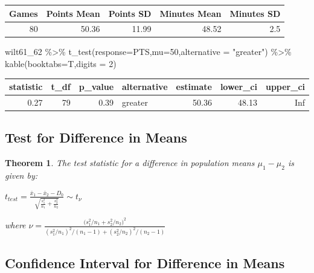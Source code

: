 \documentclass[
  11pt,
]{book}
\newenvironment{Shaded}{\begin{snugshade}}{\end{snugshade}}
\newcommand{\AttributeTok}[1]{\textcolor[rgb]{0.77,0.63,0.00}{#1}}
\newcommand{\DecValTok}[1]{\textcolor[rgb]{0.00,0.00,0.81}{#1}}
\newcommand{\FunctionTok}[1]{\textcolor[rgb]{0.00,0.00,0.00}{#1}}
\newcommand{\NormalTok}[1]{#1}
\newcommand{\SpecialCharTok}[1]{\textcolor[rgb]{0.00,0.00,0.00}{#1}}
\newcommand{\StringTok}[1]{\textcolor[rgb]{0.31,0.60,0.02}{#1}}
\newtheorem{theorem}{Theorem}[chapter]
\theoremstyle{definition}
\theoremstyle{definition}
\theoremstyle{definition}
\theoremstyle{definition}
\theoremstyle{remark}
\begin{document}
\begin{tabular}{rrrrr}
\toprule
Games & Points Mean & Points SD & Minutes Mean & Minutes SD\\
\midrule
80 & 50.36 & 11.99 & 48.52 & 2.5\\
\bottomrule
\end{tabular}

\bigskip

\begin{Shaded}
\begin{Highlighting}[]
\NormalTok{wilt61\_62 }\SpecialCharTok{\%\textgreater{}\%} \FunctionTok{t\_test}\NormalTok{(}\AttributeTok{response=}\NormalTok{PTS,}\AttributeTok{mu=}\DecValTok{50}\NormalTok{,}\AttributeTok{alternative =} \StringTok{"greater"}\NormalTok{) }\SpecialCharTok{\%\textgreater{}\%} 
  \FunctionTok{kable}\NormalTok{(}\AttributeTok{booktabs=}\NormalTok{T,}\AttributeTok{digits =} \DecValTok{2}\NormalTok{)}
\end{Highlighting}
\end{Shaded}

\begin{tabular}{rrrlrrr}
\toprule
statistic & t\_df & p\_value & alternative & estimate & lower\_ci & upper\_ci\\
\midrule
0.27 & 79 & 0.39 & greater & 50.36 & 48.13 & Inf\\
\bottomrule
\end{tabular}

\newpage

\hypertarget{test-for-difference-in-means}{%
\subsection{Test for Difference in Means}\label{test-for-difference-in-means}}

\begin{theorem}
The test statistic for a difference in population means \(\mu_1 - \mu_2\) is given by:

\(t_{test} = \frac{\bar{x}_1 -\bar{x}_2 - D_0}{\sqrt{\frac{s_1^2}{n_1}+\frac{s_2^2}{n_2}}} \sim t_{\nu}\)

where \(\nu = \frac{\big(s_1^2/n_1 + s_2^2/n_2\big)^2}{(s_1^2/n_1)^2/(n_1-1) + (s_2^2/n_2)^2/(n_2-1)}\)
\end{theorem}

\hypertarget{confidence-interval-for-difference-in-means}{%
\subsection{Confidence Interval for Difference in Means}\label{confidence-interval-for-difference-in-means}}
\end{document}
